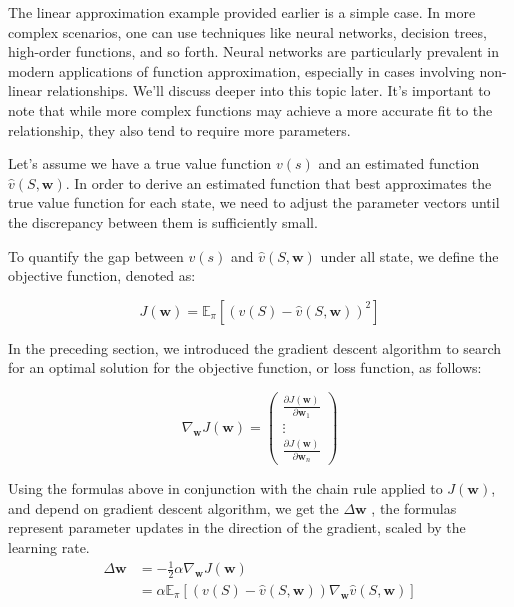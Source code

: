 \documentclass{article}
\begin{document}
The linear approximation example provided earlier is a simple case. In more complex scenarios, one can use techniques like neural networks, decision trees, high-order functions, and so forth. Neural networks are particularly prevalent in modern applications of function approximation, especially in cases involving non-linear relationships. We'll discuss deeper into this topic later. It's important to note that while more complex functions may achieve a more accurate fit to the relationship, they also tend to require more parameters.

Let's assume we have a true value function $v(s)$ and an estimated function $\hat{v}(S,\mathbf{w})$. In order to derive an estimated function that best approximates the true value function for each state, we need to adjust the parameter vectors until the discrepancy between them is sufficiently small.

To quantify the gap between  $v(s)$  and $\hat{v}(S,\mathbf{w})$ under all state, we define the objective function, denoted as:

\begin{equation}
J(\mathbf{w})=\mathbb{E}_\pi\left[\left(v(S)-\hat{v}(S, \mathbf{w})\right)^2\right]
\end{equation}


In the preceding section, we introduced the gradient descent algorithm to search for an optimal solution for the objective function, or loss function, as follows:

\begin{equation}
\nabla_{\mathbf{w}} J(\mathbf{w})=\left(\begin{array}{c}\frac{\partial J(\mathbf{w})}{\partial \mathbf{w}_1} \\ \vdots \\ \frac{\partial J(\mathbf{w})}{\partial \mathbf{w}_n}\end{array}\right)
\end{equation}

Using the formulas above in conjunction with the chain rule applied to $J(\mathbf{w})$, and depend on gradient descent algorithm, we get the $\Delta \mathbf{w}$ , the formulas represent parameter updates in the direction of the gradient, scaled by the learning rate.
\begin{equation}
\begin{aligned} \Delta \mathbf{w} & =-\frac{1}{2} \alpha \nabla_{\mathbf{w}} J(\mathbf{w}) \\ & =\alpha \mathbb{E}_\pi\left[\left(v(S)-\hat{v}(S, \mathbf{w})\right) \nabla_{\mathbf{w}} \hat{v}(S, \mathbf{w})\right]\end{aligned}
\end{equation}
\end{document}
